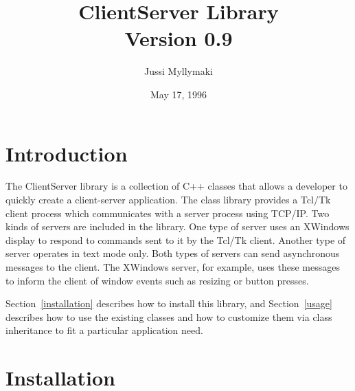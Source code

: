 







\author{Jussi Myllymaki}
\date{May 17, 1996}
\title{ClientServer Library\\{\small Version 0.9}}
\maketitle

\section{Introduction}

The ClientServer library is a collection of C++ classes that allows a
developer to quickly create a client-server application. The class
library provides a Tcl/Tk client process which communicates with a
server process using TCP/IP. Two kinds of servers are included in the
library. One type of server uses an XWindows display to respond to
commands sent to it by the Tcl/Tk client. Another type of server
operates in text mode only. Both types of servers can send
asynchronous messages to the client. The XWindows server, for example,
uses these messages to inform the client of window events such as
resizing or button presses.

Section~\ref{installation} describes how to install this library, and
Section~\ref{usage} describes how to use the existing classes and how
to customize them via class inheritance to fit a particular
application need.

\section{Installation\label{installation}}

